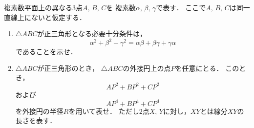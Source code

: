 \documentclass[../../main.tex]{subfiles}
\begin{document}
複素数平面上の異なる3点$A, \, B, \, C$を
複素数$\alpha, \, \beta, \, \gamma$で表す．
ここで$A, \, B, \, C$は同一直線上にないと仮定する．
\begin{enumerate}
  \item$\triangle ABC$が正三角形となる必要十分条件は，
    \[ \alpha^2+\beta^2+\gamma^2=\alpha\beta+\beta\gamma+\gamma\alpha \]
    であることを示せ．
  \item$\triangle ABC$が正三角形のとき，
    $\triangle ABC$の外接円上の点$P$を任意にとる．
    このとき，
    \[ {AP}^2+{BP}^2+{CP}^2 \]
    および
    \[ {AP}^4+{BP}^4+{CP}^4 \]
    を外接円の半径$R$を用いて表せ．
    ただし2点$X, \, Y$に対し，$XY$とは線分$XY$の長さを表す．
\end{enumerate}
\end{document}
